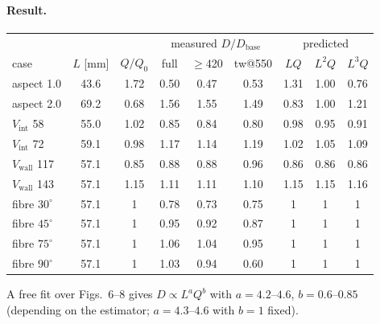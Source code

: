 \documentclass[10pt]{article}
\begin{document}
\paragraph{Result.}
\begin{center}\small\setlength{\tabcolsep}{4pt}\begin{tabular}{lccccc|ccc}
\toprule
 & & & \multicolumn{3}{c|}{measured $D/D_\text{base}$} & \multicolumn{3}{c}{predicted} \\
case & $L$ [mm] & $Q/Q_0$ & full & $\ge$420 & tw@550 & $LQ$ & $L^2Q$ & $L^3Q$ \\ \midrule
aspect 1.0 & 43.6 & 1.72 & 0.50 & 0.47 & 0.53 & 1.31 & 1.00 & 0.76 \\
aspect 2.0 & 69.2 & 0.68 & 1.56 & 1.55 & 1.49 & 0.83 & 1.00 & 1.21 \\
$V_\text{int}$ 58 & 55.0 & 1.02 & 0.85 & 0.84 & 0.80 & 0.98 & 0.95 & 0.91 \\
$V_\text{int}$ 72 & 59.1 & 0.98 & 1.17 & 1.14 & 1.19 & 1.02 & 1.05 & 1.09 \\
$V_\text{wall}$ 117 & 57.1 & 0.85 & 0.88 & 0.88 & 0.96 & 0.86 & 0.86 & 0.86 \\
$V_\text{wall}$ 143 & 57.1 & 1.15 & 1.11 & 1.11 & 1.10 & 1.15 & 1.15 & 1.16 \\
fibre $30^\circ$ & 57.1 & 1 & 0.78 & 0.73 & 0.75 & 1 & 1 & 1 \\
fibre $45^\circ$ & 57.1 & 1 & 0.95 & 0.92 & 0.87 & 1 & 1 & 1 \\
fibre $75^\circ$ & 57.1 & 1 & 1.06 & 1.04 & 0.95 & 1 & 1 & 1 \\
fibre $90^\circ$ & 57.1 & 1 & 1.03 & 0.94 & 0.60 & 1 & 1 & 1 \\ \bottomrule
\end{tabular}\end{center}
A free fit over Figs.~6--8 gives $D\propto L^{a}Q^{b}$ with $a=4.2$--$4.6$, $b=0.6$--$0.85$
(depending on the estimator; $a=4.3$--$4.6$ with $b=1$ fixed).
\end{document}
